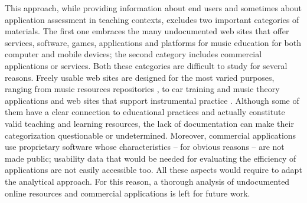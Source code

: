 \documentclass[10pt,journal,compsoc]{IEEEtran}
\begin{document}
This approach, while providing information about end users and sometimes about application assessment in teaching contexts, excludes two important categories of materials. The first one embraces the many undocumented web sites that offer services, software, games, applications and platforms for music education for both computer and mobile devices; the second category includes commercial applications or services. Both these categories are difficult to study for several reasons. Freely usable web sites are designed for the most varied purposes, ranging from music resources repositories \cite{BBC, K12}, to ear training and music theory applications \cite{FET, MT} and web sites that support instrumental practice \cite{gstrings, PTG}. Although some of them have a clear connection to educational practices and actually constitute valid teaching and learning resources, the lack of documentation can make their categorization questionable or undetermined. Moreover, commercial applications use proprietary software whose characteristics -- for obvious reasons -- are not made public; usability data that would be needed for evaluating the efficiency of applications are not easily accessible too. All these aspects would require to adapt the analytical approach. For this reason, a thorough analysis of undocumented online resources and commercial applications is left for future work.
\end{document}
